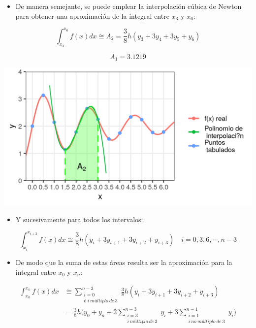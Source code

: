 \documentclass[openany]{book}
\providecommand{\tightlist}{%
  \setlength{\itemsep}{0pt}\setlength{\parskip}{0pt}}
\begin{document}
\begin{itemize}
\tightlist
\item
  De manera semejante, se puede emplear la interpolación cúbica de Newton para obtener una aproximación de la integral entre \(x_3\) y \(x_6\):
\end{itemize}

\[
\int_{x_3}^{x_6} f(x)dx \cong A_2 = \frac{3}{8} h (y_3 + 3y_4 + 3y_5 + y_6)
\]

\[A_1 = 3.1219\]

\begin{center}\includegraphics[width=1\linewidth]{Plots/U4/Unidad4_2_g9} \end{center}

\begin{itemize}
\tightlist
\item
  Y sucesivamente para todos los intervalos:
\end{itemize}

\[
\int_{x_{i}}^{x_{i+3}} f(x)dx \cong  \frac{3}{8} h (y_{i} + 3y_{i+1} + 3y_{i+2} + y_{i+3}) \quad i = 0, 3, 6, \cdots, n-3
\]

\begin{itemize}
\tightlist
\item
  De modo que la suma de estas áreas resulta ser la aproximación para la integral entre \(x_0\) y \(x_n\):
\end{itemize}

\[
\begin{aligned}
\int_{x_{0}}^{x_n} f(x)dx & \cong \sum\limits_{\substack{i = 0\\ ó~i~múltiplo~de~3}}^{n-3} \frac{3}{8} h (y_{i} + 3y_{i+1} + 3y_{i+2} + y_{i+3}) \\
 &= \frac{3}{8} h \Big( y_0 + y_n + 2 \sum \limits_{\substack{i = 3\\ i~múltiplo~de~3}}^{n-3} y_i + 3 \sum\limits_{\substack{i = 1\\ i~no~múltiplo~de~3}}^{n-1} y_i  \Big)
 \end{aligned}
\]
\end{document}

